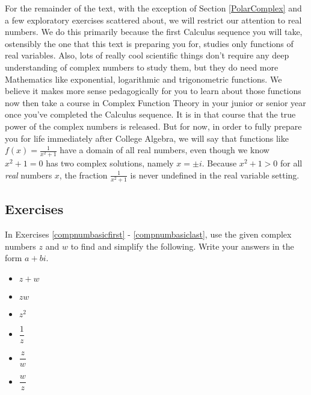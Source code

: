 For the remainder of the text, with the exception of Section \ref{PolarComplex} and a few exploratory exercises scattered about, we will restrict our attention to real numbers.  We do this primarily because the first Calculus sequence you will take, ostensibly the one that this text is preparing you for, studies only functions of real variables.  Also, lots of really cool scientific things don't require any deep understanding of complex numbers to study them, but they do need more Mathematics like exponential, logarithmic and trigonometric functions.  We believe it makes more sense pedagogically for you to learn about those functions now then take a course in Complex Function Theory in your junior or senior year once you've completed the Calculus sequence.  It is in that course that the true power of the complex numbers is released.  But for now, in order to fully prepare you for life immediately after College Algebra, we will say that functions like $f(x) = \frac{1}{x^{2} + 1}$ have a domain of all real numbers, even though we know $x^{2} + 1 = 0$ has two complex solutions, namely $x = \pm i$.  Because $x^{2} + 1 > 0$ for all \emph{real} numbers $x$, the fraction $\frac{1}{x^{2} + 1}$ is never undefined in the real variable setting.

\newpage

\subsection{Exercises}


In Exercises \ref{compnumbasicfirst} - \ref{compnumbasiclast}, use the given complex numbers $z$ and $w$ to find and simplify the following.  Write your answers in the form $a+bi$. 

\begin{multicols}{3}

\begin{itemize}

\item $z+w$
\item $zw$
\item $z^2$

\end{itemize}

\end{multicols}

\begin{multicols}{3}

\begin{itemize}

\item $\dfrac{1}{z}$
\item $\dfrac{z}{w}$
\item $\dfrac{w}{z}$

\end{itemize}

\end{multicols}

